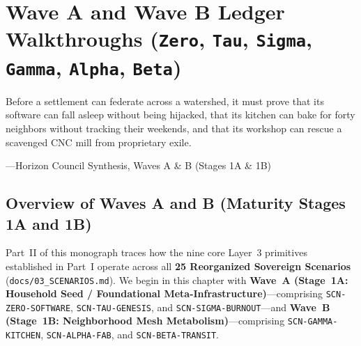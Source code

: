 \chapter{Wave A and Wave B Ledger Walkthroughs (\texttt{Zero}, \texttt{Tau}, \texttt{Sigma}, \texttt{Gamma}, \texttt{Alpha}, \texttt{Beta})}
\label{ch:waves-a-and-b}

\epigraph{Before a settlement can federate across a watershed, it must prove that its software can fall asleep without being hijacked, that its kitchen can bake for forty neighbors without tracking their weekends, and that its workshop can rescue a scavenged CNC mill from proprietary exile.}{---Horizon Council Synthesis, Waves A \& B (Stages 1A \& 1B)}

\section{Overview of Waves A and B (Maturity Stages 1A and 1B)}
\label{sec:ch10-overview}

Part~II of this monograph traces how the nine core Layer~3 primitives established in Part~I operate across all \textbf{25 Reorganized Sovereign Scenarios} (\texttt{docs/03\_SCENARIOS.md}). We begin in this chapter with \textbf{Wave~A (Stage~1A: Household Seed / Foundational Meta-Infrastructure)}---comprising \texttt{SCN-ZERO-SOFTWARE}, \texttt{SCN-TAU-GENESIS}, and \texttt{SCN-SIGMA-BURNOUT}---and \textbf{Wave~B (Stage~1B: Neighborhood Mesh Metabolism)}---comprising \texttt{SCN-GAMMA-KITCHEN}, \texttt{SCN-ALPHA-FAB}, and \texttt{SCN-BETA-TRANSIT}.

